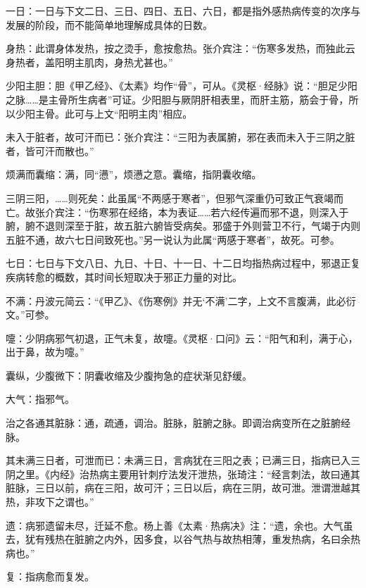 \documentclass[draft,12pt]{ctexbook}
\begin{document}

\begin{jiaozhu}
	\item 一日：一日与下文二日、三日、四日、五日、六日，都是指外感热病传变的次序与发展的阶段，而不能简单地理解成具体的日数。
	\item 身热：此谓身体发热，按之烫手，愈按愈热。张介宾注：“伤寒多发热，而独此云身热者，盖阳明主肌肉，身热尤甚也。”
	\item 少阳主胆：胆《甲乙经》、《太素》均作“骨”，可从。《灵枢·经脉》说：“胆足少阳之脉……是主骨所生病者”可证。少阳胆与厥阴肝相表里，而肝主筋，筋会于骨，所以少阳主骨。此可与上文“阳明主肉”相应。
	\item 未入于脏者，故可汗而已：张介宾注：“三阳为表属腑，邪在表而未入于三阴之脏者，皆可汗而散也。”
	\item 烦满而囊缩：满，同“懑”，烦懑之意。囊缩，指阴囊收缩。
	\item 三阴三阳，……则死矣：此虽属“不两感于寒者”，但邪气深重仍可致正气衰竭而亡。故张介宾注：“伤寒邪在经络，本为表证……若六经传遍而邪不退，则深入于腑，腑不退则深至于脏，故五脏六腑皆受病矣。邪盛于外则营卫不行，气竭于内则五脏不通，故六七日间致死也。”另一说认为此属“两感于寒者”，故死。可参。
	\item 七日：七日与下文八日、九日、十日、十一日、十二日均指热病过程中，邪退正复疾病转愈的概数，其时间长短取决于邪正力量的对比。
	\item 不满：丹波元简云：“《甲乙》、《伤寒例》并无‘不满’二字，上文不言腹满，此必衍文。”可参。
	\item 嚏：少阴病邪气初退，正气未复，故嚏。《灵枢·口问》云：“阳气和利，满于心，出于鼻，故为嚏。”
	\item 囊纵，少腹微下：阴囊收缩及少腹拘急的症状渐见舒缓。
	\item 大气：指邪气。
	\item 治之各通其脏脉：通，疏通，调治。脏脉，脏腑之脉。即调治病变所在之脏腑经脉。
	\item 其未满三日者，可泄而已：未满三日，言病犹在三阳之表；已满三日，指病已入三阴之里。《内经》治热病主要用针刺疗法发汗泄热，张琦注：“经言刺法，故曰通其脏脉，三日以前，病在三阳，故可汗；三日以后，病在三阴，故可泄。泄谓泄越其热，非攻下之谓也。”
	\item 遗：病邪遗留未尽，迁延不愈。杨上善《太素·热病决》注：“遗，余也。大气虽去，犹有残热在脏腑之内外，因多食，以谷气热与故热相薄，重发热病，名曰余热病也。”
	\item 复：指病愈而复发。
\end{jiaozhu}

\end{document}

